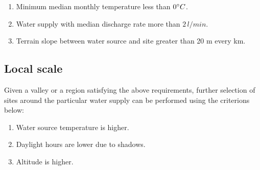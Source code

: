 
\begin{enumerate}

  \item Minimum median monthly temperature less than $0 ^{\circ} C$. 
  \item Water supply with median discharge rate more than $2\, l/min$.
  \item Terrain slope between water source and site greater than 20 m every km. 

\end{enumerate}

\subsection{Local scale}

Given a valley or a region satisfying the above requirements, further selection of sites around the particular
water supply can be performed using the criterions below: 

\begin{enumerate}
  \item Water source temperature is higher.
  \item Daylight hours are lower due to shadows.
  \item Altitude is higher.
\end{enumerate}








